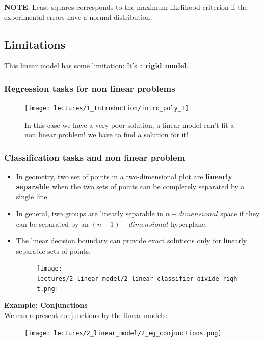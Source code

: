 \documentclass[../main.tex]{subfiles}
\begin{document}
\noindent\textbf{NOTE}: Least squares corresponds to the maximum likelihood criterion if the
experimental errors have a normal distribution.

\subsection{Limitations}
This linear model has some limitation: It's a \textbf{rigid model}.

\subsubsection*{Regression tasks for non linear problems}
\begin{figure}[H]
    \centering
    \texttt{[image: lectures/1\_Introduction/intro\_poly\_1]}
    \caption{\scriptsize In this case we have a very poor solution, a linear model can't fit a non linear problem! we have to find a solution for it!}
    \label{fig:2task_poor}
\end{figure}

\subsubsection*{Classification tasks and non linear problem}
\begin{itemize}
    \item In geometry, two set of points in a two-dimensional plot are \textbf{linearly separable} when the two sets of points can be completely separated by a single line.
    \item In general, two groups are linearly separable in $n-dimensional$ space if they can be separated by an $(n-1)-dimensional$ hyperplane.
    \item The linear decision boundary can provide exact solutions only for linearly separable sets of points.
    \begin{figure}[H]
        \centering
        \texttt{[image: lectures/2\_linear\_model/2\_linear\_classifier\_divide\_right.png]}
    \end{figure}
\end{itemize}

\textbf{Example: Conjunctions}\\
We can represent conjunctions by the linear models:
\begin{figure}[H]
    \centering
    \texttt{[image: lectures/2\_linear\_model/2\_eg\_conjunctions.png]}
\end{figure}
\end{document}
